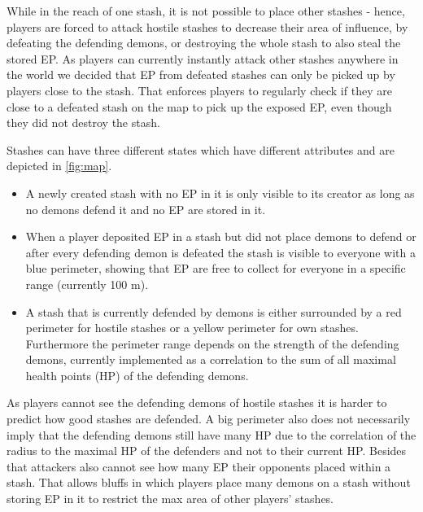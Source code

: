 While in the reach of one stash, it is not possible to place other stashes - hence, players are forced to attack hostile stashes to decrease their area of influence, by defeating the defending demons, or destroying the whole stash to also steal the stored EP.
As players can currently instantly attack other stashes anywhere in the world we decided that EP from defeated stashes can only be picked up by players close to the stash.
That enforces players to regularly check if they are close to a defeated stash on the map to pick up the exposed EP, even though they did not destroy the stash.

Stashes can have three different states which have different attributes and are depicted in \autoref{fig:map}.

\begin{itemize}
    \item A newly created stash with no EP in it is only visible to its creator as long as no demons defend it and no EP are stored in it.
    \item When a player deposited EP in a stash but did not place demons to defend or after every defending demon is defeated the stash is visible to everyone with a blue perimeter, showing that EP are free to collect for everyone in a specific range (currently 100 m).
    \item A stash that is currently defended by demons is either surrounded by a red perimeter for hostile stashes or a yellow perimeter for own stashes. 
Furthermore the perimeter range depends on the strength of the defending demons, currently implemented as a correlation to the sum of all maximal health points (HP) of the defending demons.
\end{itemize}

As players cannot see the defending demons of hostile stashes it is harder to predict how good stashes are defended.
A big perimeter also does not necessarily imply that the defending demons still have many HP due to the correlation of the radius to the maximal HP of the defenders and not to their current HP.
Besides that attackers also cannot see how many EP their opponents placed within a stash.
That allows bluffs in which players place many demons on a stash without storing EP in it to restrict the max area of other players' stashes.

